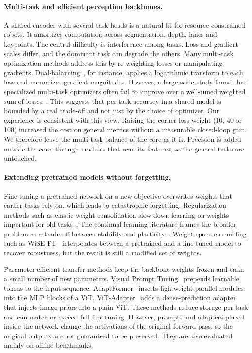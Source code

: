 \documentclass[10pt,twocolumn,letterpaper]{article}
\begin{document}
\paragraph{Multi-task and efficient perception backbones.}
A shared encoder with several task heads is a natural fit for resource-constrained robots. It amortizes computation across segmentation, depth, lanes and keypoints. The central difficulty is interference among tasks. Loss and gradient scales differ, and the dominant task can degrade the others. Many multi-task optimization methods address this by re-weighting losses or manipulating gradients. Dual-balancing~\cite{Lin2023DualbalancingMultitask}, for instance, applies a logarithmic transform to each loss and normalizes gradient magnitudes. However, a large-scale study found that specialized multi-task optimizers often fail to improve over a well-tuned weighted sum of losses~\cite{Xin2022DoCurrent}. This suggests that per-task accuracy in a shared model is bounded by a real trade-off and not just by the choice of optimizer. Our experience is consistent with this view. Raising the corner loss weight (10, 40 or 100) increased the cost on general metrics without a measurable closed-loop gain. We therefore leave the multi-task balance of the core as it is. Precision is added outside the core, through modules that read its features, so the general tasks are untouched.

\paragraph{Extending pretrained models without forgetting.}
Fine-tuning a pretrained network on a new objective overwrites weights that earlier tasks rely on, which leads to catastrophic forgetting. Regularization methods such as elastic weight consolidation slow down learning on weights important for old tasks~\cite{Kirkpatrick2016OvercomingCatastrophic}. The continual learning literature frames the broader problem as a trade-off between stability and plasticity~\cite{Wang2023ComprehensiveSurvey}. Weight-space ensembling such as WiSE-FT~\cite{Wortsman2021RobustFinetuning} interpolates between a pretrained and a fine-tuned model to recover robustness, but the result is still a modified set of weights.

Parameter-efficient transfer methods keep the backbone weights frozen and train a small number of new parameters. Visual Prompt Tuning~\cite{Jia2022VisualPrompt} prepends learnable tokens to the input sequence. AdaptFormer~\cite{Chen2022AdaptformerAdapting} inserts lightweight parallel modules into the MLP blocks of a ViT. ViT-Adapter~\cite{Chen2022VisionTransformer} adds a dense-prediction adapter that injects image priors into a plain ViT. These methods reduce storage per task and can match or exceed full fine-tuning. However, prompts and adapters placed inside the network change the activations of the original forward pass, so the original outputs are not guaranteed to be preserved. They are also evaluated mainly on offline benchmarks.
\end{document}
